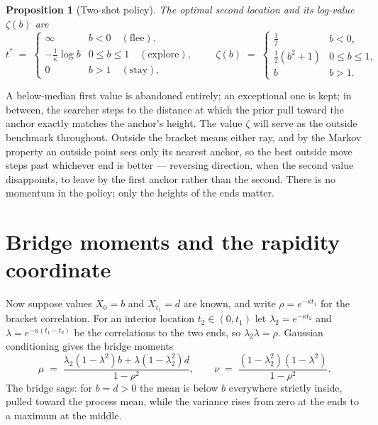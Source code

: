 \documentclass[11pt]{article}
\theoremstyle{itheads}
\newtheorem{proposition}{Proposition}
\begin{document}
\begin{proposition}[Two-shot policy]\label{prop:twoshot}
The optimal second location and its log-value $\zeta(b)$ are
\begin{equation}
t^{*} \;=\;
\begin{cases}
\infty & b<0 \quad(\text{flee}),\\[2pt]
-\tfrac{1}{\kappa}\log b & 0\le b\le 1 \quad(\text{explore}),\\[2pt]
0 & b>1 \quad(\text{stay}),
\end{cases}
\qquad
\zeta(b) \;=\;
\begin{cases}
\tfrac{1}{2} & b<0,\\[2pt]
\tfrac{1}{2}\left(b^{2}+1\right) & 0\le b\le 1,\\[2pt]
b & b>1 .
\end{cases}
\end{equation}
\end{proposition}

A below-median first value is abandoned entirely; an exceptional one is
kept; in between, the searcher steps to the distance at which the prior
pull toward the anchor exactly matches the anchor's height. The value
$\zeta$ will serve as the outside benchmark throughout. Outside the
bracket means either ray, and by the Markov property an outside point
sees only its nearest anchor, so the best outside move steps past
whichever end is better --- reversing direction, when the second value
disappoints, to leave by the first anchor rather than the second.
There is no momentum in the policy; only the heights of the ends
matter.

\section{Bridge moments and the rapidity coordinate}

Now suppose values $X_0=b$ and $X_{t_1}=d$ are known, and write
$\rho=e^{-\kappa t_1}$ for the bracket correlation. For an interior
location $t_2\in(0,t_1)$ let $\lambda_2=e^{-\kappa t_2}$ and
$\lambda=e^{-\kappa(t_1-t_2)}$ be the correlations to the two ends, so
$\lambda_2\lambda=\rho$. Gaussian conditioning gives the bridge moments
\begin{equation}\label{eq:bridge}
\mu \;=\; \frac{\lambda_2\!\left(1-\lambda^{2}\right)b
+ \lambda\!\left(1-\lambda_2^{2}\right)d}{1-\rho^{2}},
\qquad
\nu \;=\; \frac{\left(1-\lambda_2^{2}\right)\left(1-\lambda^{2}\right)}
{1-\rho^{2}} .
\end{equation}
The bridge sags: for $b=d>0$ the mean is below $b$ everywhere strictly
inside, pulled toward the process mean, while the variance rises from
zero at the ends to a maximum at the middle.
\end{document}
